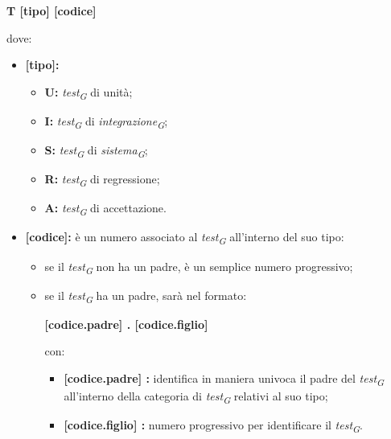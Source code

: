 \begin{center}
    \textbf{T [tipo] [codice]}
\end{center}
dove:

\begin{itemize}
    \item \textbf{[tipo]:} 
        \begin{itemize}
            \item \textbf{U:} 
                \textit{test}\textsubscript{\textit{G}} di unità;
            \item \textbf{I:} 
                \textit{test}\textsubscript{\textit{G}} di \textit{integrazione}\textsubscript{\textit{G}};
            \item \textbf{S:} 
                \textit{test}\textsubscript{\textit{G}} di \textit{sistema}\textsubscript{\textit{G}};
            \item \textbf{R:} 
                \textit{test}\textsubscript{\textit{G}} di regressione;
            \item\textbf{A:} 
                \textit{test}\textsubscript{\textit{G}} di accettazione.
        \end{itemize}
    \item \textbf{[codice]:} 
        è un numero associato al \textit{test}\textsubscript{\textit{G}} all'interno del suo tipo: 
        \begin{itemize}
            \item 
                se il \textit{test}\textsubscript{\textit{G}} non ha un padre, è un semplice numero progressivo;
            \item 
                se il \textit{test}\textsubscript{\textit{G}} ha un padre, sarà nel formato:
                \begin{center}
                    \textbf{[codice.padre] . [codice.figlio]} 
                \end{center}
                con:
                \begin{itemize}
                    \item \textbf{[codice.padre] :} 
                        identifica in maniera univoca il padre del \textit{test}\textsubscript{\textit{G}} all'interno della categoria di \textit{test}\textsubscript{\textit{G}} relativi al suo tipo;
                    \item \textbf{[codice.figlio] :} 
                        numero progressivo per identificare il \textit{test}\textsubscript{\textit{G}}.
                \end{itemize}
        \end{itemize}
\end{itemize}

